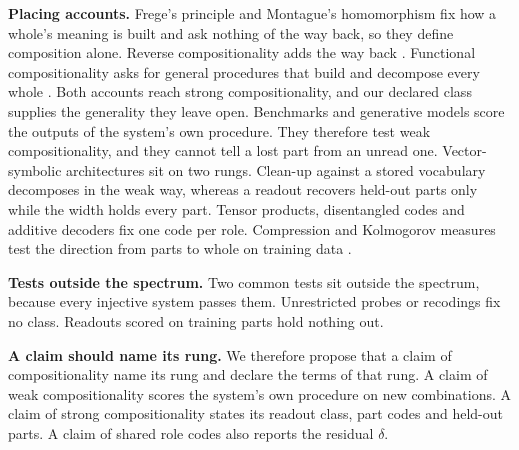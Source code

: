 \textbf{Placing accounts.} Frege's principle and Montague's homomorphism fix how a whole's meaning is built and ask nothing of the way back, so they define composition alone. Reverse compositionality adds the way back \citep{fodor2002}. Functional compositionality asks for general procedures that build and decompose every whole \citep{vangelder1990}. Both accounts reach strong compositionality, and our declared class supplies the generality they leave open. Benchmarks and generative models score the outputs of the system's own procedure. They therefore test weak compositionality, and they cannot tell a lost part from an unread one. Vector-symbolic architectures sit on two rungs. Clean-up against a stored vocabulary decomposes in the weak way, whereas a readout recovers held-out parts only while the width holds every part. Tensor products, disentangled codes and additive decoders fix one code per role. Compression and Kolmogorov measures test the direction from parts to whole on training data \citep{andreas2019,elmoznino2024,elmoznino2026}.

\textbf{Tests outside the spectrum.} Two common tests sit outside the spectrum, because every injective system passes them. Unrestricted probes or recodings fix no class. Readouts scored on training parts hold nothing out.

\textbf{A claim should name its rung.} We therefore propose that a claim of compositionality name its rung and declare the terms of that rung. A claim of weak compositionality scores the system's own procedure on new combinations. A claim of strong compositionality states its readout class, part codes and held-out parts. A claim of shared role codes also reports the residual $\delta$.


